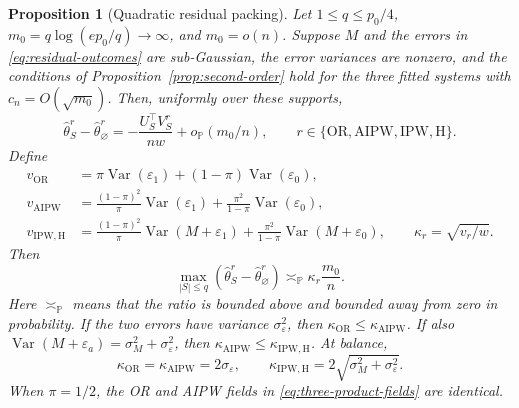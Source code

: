 \documentclass[a4paper,10pt,english]{article}
\newtheorem{proposition}{Proposition}[section]
\newcommand{\Prob}{\mathbb P}
\newcommand{\Var}{\operatorname{Var}}
\begin{document}
\begin{proposition}[Quadratic residual packing]
\label{prop:residual-packing}
Let $1\le q\le p_0/4$,
$m_0=q\log(ep_0/q)\to\infty$, and $m_0=o(n)$.  Suppose $M$ and the errors
in \eqref{eq:residual-outcomes} are sub-Gaussian, the error variances are
nonzero, and the conditions of Proposition~\ref{prop:second-order} hold for
the three fitted systems with $c_n=O(\sqrt{m_0})$.  Then, uniformly over
these supports,
\begin{equation}\label{eq:three-product-fields}
 \hat\theta_S^r-\hat\theta_\varnothing^r
 =-\frac{U_S^\top V_S^r}{nw}
 +o_{\Prob}(m_0/n),
 \qquad
 r\in\{\mathrm{OR},\mathrm{AIPW},\mathrm{IPW,H}\}.
\end{equation}
Define
\begin{align*}
 v_{\mathrm{OR}}
 &=\pi\Var(\varepsilon_1)+(1-\pi)\Var(\varepsilon_0),\\
 v_{\mathrm{AIPW}}
 &=\frac{(1-\pi)^2}{\pi}\Var(\varepsilon_1)
   +\frac{\pi^2}{1-\pi}\Var(\varepsilon_0),\\
 v_{\mathrm{IPW,H}}
 &=\frac{(1-\pi)^2}{\pi}\Var(M+\varepsilon_1)
   +\frac{\pi^2}{1-\pi}\Var(M+\varepsilon_0),
 \qquad
 \kappa_r=\sqrt{v_r/w}.
\end{align*}
Then
\begin{equation}\label{eq:residual-packing-rate}
 \max_{|S|\le q}
 (\hat\theta_S^r-\hat\theta_\varnothing^r)
 \asymp_{\Prob}\kappa_r\frac{m_0}{n}.
\end{equation}
Here $\asymp_{\Prob}$ means that the ratio is bounded above and bounded
away from zero in probability.
If the two errors have variance $\sigma_\varepsilon^2$, then
$\kappa_{\mathrm{OR}}\le\kappa_{\mathrm{AIPW}}$.  If also
$\Var(M+\varepsilon_a)=\sigma_M^2+\sigma_\varepsilon^2$, then
$\kappa_{\mathrm{AIPW}}\le\kappa_{\mathrm{IPW,H}}$.  At balance,
\begin{equation}\label{eq:balanced-packing-constants}
 \kappa_{\mathrm{OR}}=\kappa_{\mathrm{AIPW}}
 =2\sigma_\varepsilon,
 \qquad
 \kappa_{\mathrm{IPW,H}}
 =2\sqrt{\sigma_M^2+\sigma_\varepsilon^2}.
\end{equation}
When $\pi=1/2$, the OR and AIPW fields in
\eqref{eq:three-product-fields} are identical.
\end{proposition}
\end{document}
